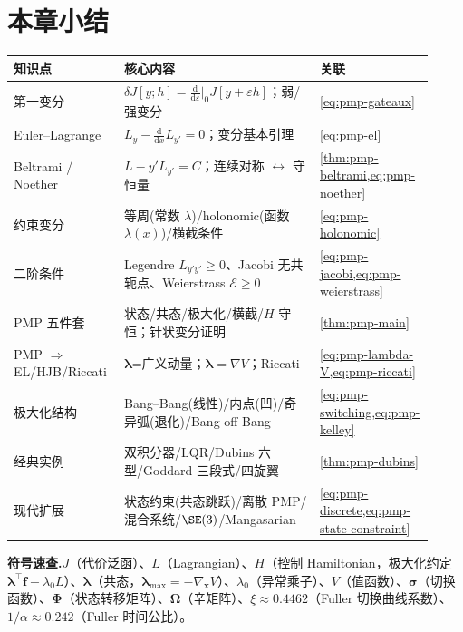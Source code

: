 \section*{本章小结}
\begin{center}\small
\begin{longtable}{p{0.26\linewidth}p{0.46\linewidth}p{0.2\linewidth}}
\toprule
知识点 & 核心内容 & 关联\\
\midrule
第一变分 & $\delta J[y;h]=\frac{\mathrm d}{\mathrm d\varepsilon}|_0 J[y+\varepsilon h]$；弱/强变分 & \cref{eq:pmp-gateaux}\\
Euler--Lagrange & $L_y-\frac{\mathrm d}{\mathrm dx}L_{y'}=0$；变分基本引理 & \cref{eq:pmp-el}\\
Beltrami / Noether & $L-y'L_{y'}=C$；连续对称 $\leftrightarrow$ 守恒量 & \cref{thm:pmp-beltrami,eq:pmp-noether}\\
约束变分 & 等周(常数 $\lambda$)/holonomic(函数 $\lambda(x)$)/横截条件 & \cref{eq:pmp-holonomic}\\
二阶条件 & Legendre $L_{y'y'}\ge0$、Jacobi 无共轭点、Weierstrass $\mathcal E\ge0$ & \cref{eq:pmp-jacobi,eq:pmp-weierstrass}\\
PMP 五件套 & 状态/共态/极大化/横截/$H$ 守恒；针状变分证明 & \cref{thm:pmp-main}\\
PMP $\Rightarrow$ EL/HJB/Riccati & $\boldsymbol\lambda$=广义动量；$\boldsymbol\lambda=\nabla V$；Riccati & \cref{eq:pmp-lambda-V,eq:pmp-riccati}\\
极大化结构 & Bang--Bang(线性)/内点(凹)/奇异弧(退化)/Bang-off-Bang & \cref{eq:pmp-switching,eq:pmp-kelley}\\
经典实例 & 双积分器/LQR/Dubins 六型/Goddard 三段式/四旋翼 & \cref{thm:pmp-dubins}\\
现代扩展 & 状态约束(共态跳跃)/离散 PMP/混合系统/$\SE(3)$/Mangasarian & \cref{eq:pmp-discrete,eq:pmp-state-constraint}\\
\bottomrule
\end{longtable}
\end{center}

\noindent\textbf{符号速查.}\;$J$（代价泛函）、$L$（Lagrangian）、$H$（控制 Hamiltonian，极大化约定 $\boldsymbol\lambda^\top\mathbf f-\lambda_0 L$）、$\boldsymbol\lambda$（共态，$\boldsymbol\lambda_{\max}=-\nabla_{\mathbf x}V$）、$\lambda_0$（异常乘子）、$V$（值函数）、$\boldsymbol\sigma$（切换函数）、$\boldsymbol\Phi$（状态转移矩阵）、$\boldsymbol\Omega$（辛矩阵）、$\xi\approx0.4462$（Fuller 切换曲线系数）、$1/\alpha\approx0.242$（Fuller 时间公比）。

